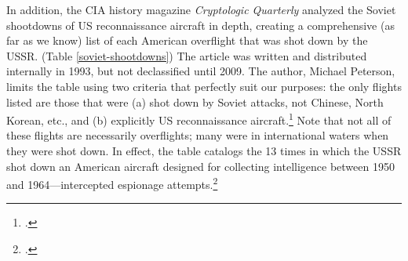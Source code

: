 \documentclass{report}
\begin{document}
\begin{refsegment}
In addition, the CIA history magazine \emph{Cryptologic Quarterly} analyzed the Soviet shootdowns of US reconnaissance aircraft in depth, creating a comprehensive (as far as we know) list of each American overflight that was shot down by the USSR. (Table \ref{soviet-shootdowns}) The article was written and distributed internally in 1993, but not declassified until 2009. The author, Michael Peterson, limits the table using two criteria that perfectly suit our purposes: the only flights listed are those that were (a) shot down by Soviet attacks, not Chinese, North Korean, etc., and (b) explicitly US reconnaissance aircraft.\footcite[p.~4]{peterson_maybe_1993} Note that not all of these flights are necessarily overflights; many were in international waters when they were shot down. In effect, the table catalogs the 13 times in which the USSR shot down an American aircraft designed for collecting intelligence between 1950 and 1964---intercepted espionage attempts.\footcite[p.~5. In the original document, this table lists the first incident as having taken place over the Barents Sea, not the Baltic Sea. Because the description of the mission---including a map of its route in the same document---takes place entirely over the Baltic sea, I have concluded that this has to be a typographical error, and corrected it here.]{peterson_maybe_1993}


\end{refsegment}
\end{document}
